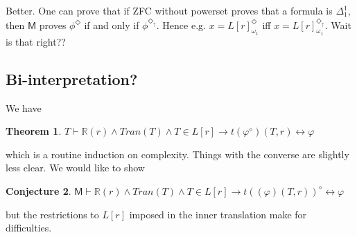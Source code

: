 \documentclass{article}
\newtheorem{Theorem}{Theorem}[section]
\theoremstyle{definition}
\newtheorem{Conjecture}[Theorem]{Conjecture}
\newcommand{\du}{\Diamond_\uparrow}
\begin{document}
Better. One can prove that if ZFC without powerset proves that a formula is 
$\Delta^1_1$, then $\mathsf{M}$ proves $\phi^\Diamond$ if and only if $\phi^{\du}$.
Hence e.g. $x = L[r]_{\omega_1}^\Diamond$ iff $x = L[r]_{\omega_1}^{\du}$. Wait is that right??
\subsection{Bi-interpretation?}
We have
\begin{Theorem}
    $T \vdash \mathbb{R}(r) \wedge Tran(T) \wedge T \in L[r] \rightarrow t(\varphi^\diamond)(T, r) \leftrightarrow \varphi$
\end{Theorem}
which is a routine induction on complexity. Things with the converse are slightly less clear. We would like
to show
\begin{Conjecture}
    $\mathsf{M} \vdash \mathbb{R}(r) \wedge Tran(T) \wedge T \in L[r] \rightarrow t((\varphi)(T, r))^\diamond \leftrightarrow \varphi$
\end{Conjecture}
but the restrictions to $L[r]$ imposed in the inner translation make for difficulties.
\end{document}
